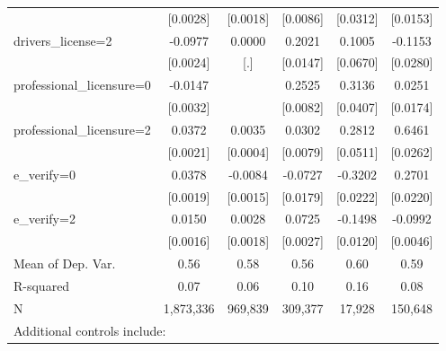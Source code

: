 \begin{table}[htbp]
\begin{tabular}{l*{5}{c}}
                    &    [0.0028]         &    [0.0018]         &    [0.0086]         &    [0.0312]         &    [0.0153]         \\
\addlinespace
drivers\_license=2   &     -0.0977\sym{***}&      0.0000         &      0.2021\sym{***}&      0.1005         &     -0.1153\sym{***}\\
                    &    [0.0024]         &         [.]         &    [0.0147]         &    [0.0670]         &    [0.0280]         \\
\addlinespace
professional\_licensure=0&     -0.0147\sym{***}&                     &      0.2525\sym{***}&      0.3136\sym{***}&      0.0251         \\
                    &    [0.0032]         &                     &    [0.0082]         &    [0.0407]         &    [0.0174]         \\
\addlinespace
professional\_licensure=2&      0.0372\sym{***}&      0.0035\sym{***}&      0.0302\sym{***}&      0.2812\sym{***}&      0.6461\sym{***}\\
                    &    [0.0021]         &    [0.0004]         &    [0.0079]         &    [0.0511]         &    [0.0262]         \\
\addlinespace
e\_verify=0          &      0.0378\sym{***}&     -0.0084\sym{***}&     -0.0727\sym{***}&     -0.3202\sym{***}&      0.2701\sym{***}\\
                    &    [0.0019]         &    [0.0015]         &    [0.0179]         &    [0.0222]         &    [0.0220]         \\
\addlinespace
e\_verify=2          &      0.0150\sym{***}&      0.0028         &      0.0725\sym{***}&     -0.1498\sym{***}&     -0.0992\sym{***}\\
                    &    [0.0016]         &    [0.0018]         &    [0.0027]         &    [0.0120]         &    [0.0046]         \\
\midrule
Mean of Dep. Var.   &        0.56         &        0.58         &        0.56         &        0.60         &        0.59         \\
R-squared           &        0.07         &        0.06         &        0.10         &        0.16         &        0.08         \\
N                   &   1,873,336         &     969,839         &     309,377         &      17,928         &     150,648         \\
\bottomrule
\multicolumn{6}{l}{\footnotesize Additional controls include:}\\

\end{tabular}
\end{table}
